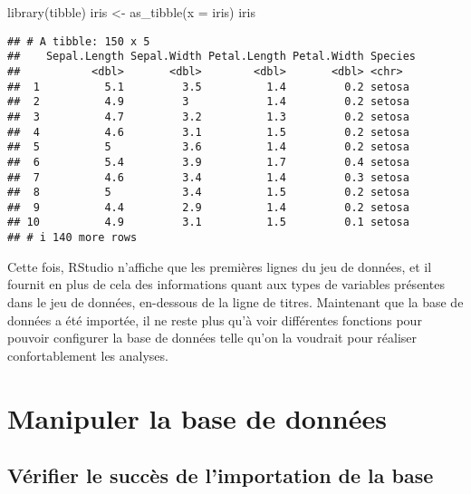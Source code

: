 \documentclass[
]{book}
\newenvironment{Shaded}{\begin{snugshade}}{\end{snugshade}}
\newcommand{\AttributeTok}[1]{\textcolor[rgb]{0.77,0.63,0.00}{#1}}
\newcommand{\FunctionTok}[1]{\textcolor[rgb]{0.00,0.00,0.00}{#1}}
\newcommand{\NormalTok}[1]{#1}
\newcommand{\OtherTok}[1]{\textcolor[rgb]{0.56,0.35,0.01}{#1}}
\begin{document}
\begin{Shaded}
\begin{Highlighting}[]
\FunctionTok{library}\NormalTok{(tibble)}
\NormalTok{iris }\OtherTok{\textless{}{-}} \FunctionTok{as\_tibble}\NormalTok{(}\AttributeTok{x =}\NormalTok{ iris)}
\NormalTok{iris}
\end{Highlighting}
\end{Shaded}

\begin{verbatim}
## # A tibble: 150 x 5
##    Sepal.Length Sepal.Width Petal.Length Petal.Width Species
##           <dbl>       <dbl>        <dbl>       <dbl> <chr>  
##  1          5.1         3.5          1.4         0.2 setosa 
##  2          4.9         3            1.4         0.2 setosa 
##  3          4.7         3.2          1.3         0.2 setosa 
##  4          4.6         3.1          1.5         0.2 setosa 
##  5          5           3.6          1.4         0.2 setosa 
##  6          5.4         3.9          1.7         0.4 setosa 
##  7          4.6         3.4          1.4         0.3 setosa 
##  8          5           3.4          1.5         0.2 setosa 
##  9          4.4         2.9          1.4         0.2 setosa 
## 10          4.9         3.1          1.5         0.1 setosa 
## # i 140 more rows
\end{verbatim}

Cette fois, RStudio n'affiche que les premières lignes du jeu de données, et il fournit en plus de cela des informations quant aux types de variables présentes dans le jeu de données, en-dessous de la ligne de titres. Maintenant que la base de données a été importée, il ne reste plus qu'à voir différentes fonctions pour pouvoir configurer la base de données telle qu'on la voudrait pour réaliser confortablement les analyses.

\hypertarget{manipuler-la-base-de-donnuxe9es}{%
\section{Manipuler la base de données}\label{manipuler-la-base-de-donnuxe9es}}

\hypertarget{vuxe9rifier-le-succuxe8s-de-limportation-de-la-base}{%
\subsection{Vérifier le succès de l'importation de la base}\label{vuxe9rifier-le-succuxe8s-de-limportation-de-la-base}}
\end{document}
